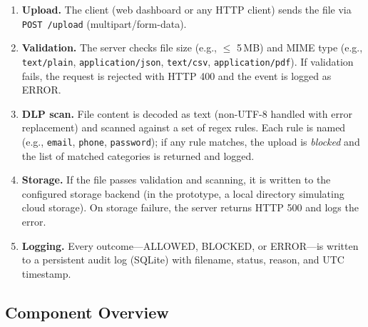 \documentclass[11pt,a4paper]{article}
\begin{document}
\begin{enumerate}
  \item \textbf{Upload.} The client (web dashboard or any HTTP client) sends the file via \texttt{POST /upload} (multipart/form-data).
  \item \textbf{Validation.} The server checks file size (e.g., $\leq$ 5\,MB) and MIME type (e.g., \texttt{text/plain}, \texttt{application/json}, \texttt{text/csv}, \texttt{application/pdf}). If validation fails, the request is rejected with HTTP 400 and the event is logged as ERROR.
  \item \textbf{DLP scan.} File content is decoded as text (non-UTF-8 handled with error replacement) and scanned against a set of regex rules. Each rule is named (e.g., \texttt{email}, \texttt{phone}, \texttt{password}); if any rule matches, the upload is \emph{blocked} and the list of matched categories is returned and logged.
  \item \textbf{Storage.} If the file passes validation and scanning, it is written to the configured storage backend (in the prototype, a local directory simulating cloud storage). On storage failure, the server returns HTTP 500 and logs the error.
  \item \textbf{Logging.} Every outcome---ALLOWED, BLOCKED, or ERROR---is written to a persistent audit log (SQLite) with filename, status, reason, and UTC timestamp.
\end{enumerate}

\subsection{Component Overview}
\end{document}
